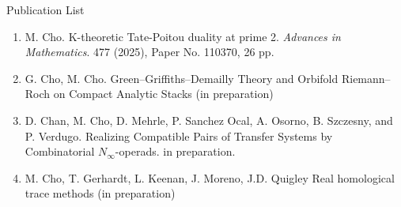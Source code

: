 \documentclass[11pt]{article}
\begin{document}

\begin{center}
\LARGE{Publication List}
\end{center}
\begin{enumerate}
    \item M. Cho. {K-theoretic Tate-Poitou duality at prime 2}. {\it Advances in Mathematics}. 477 (2025), Paper No. 110370, 26 pp. 

    \item G. Cho, M. Cho.  Green–Griffiths–Demailly Theory and Orbifold Riemann–Roch on Compact Analytic Stacks (in preparation)

    \item D. Chan, M. Cho, D. Mehrle, P. Sanchez Ocal, A. Osorno, B. Szczesny, and P. Verdugo. Realizing Compatible Pairs of Transfer Systems by Combinatorial $N_\infty$-operads. in preparation.
    
    \item M. Cho, T. Gerhardt, L. Keenan, J. Moreno, J.D. Quigley Real homological trace methods (in preparation)
\end{enumerate}
\end{document}
